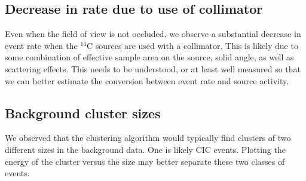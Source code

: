 \documentclass[11pt]{article}
\newcommand{\nuc}[2]{\ensuremath{^{#1}}#2}
\begin{document}
\subsection{Decrease in rate due to use of collimator}
Even when the field of view is not occluded, we observe a substantial decrease in event rate when the \nuc{14}{C} sources are used with a collimator. This is likely due to some combination of 
effective sample area on the source, solid angle, as well as scattering effects. This needs to be understood, or at least well measured so that we can better estimate the conversion between event rate and source activity. 

\subsection{Background cluster sizes}
We observed that the clustering algorithm would typically find clusters of two different sizes in the background data. One is likely CIC events. Plotting the energy of the cluster versus the size may better separate these two classes of events. 
\end{document}
